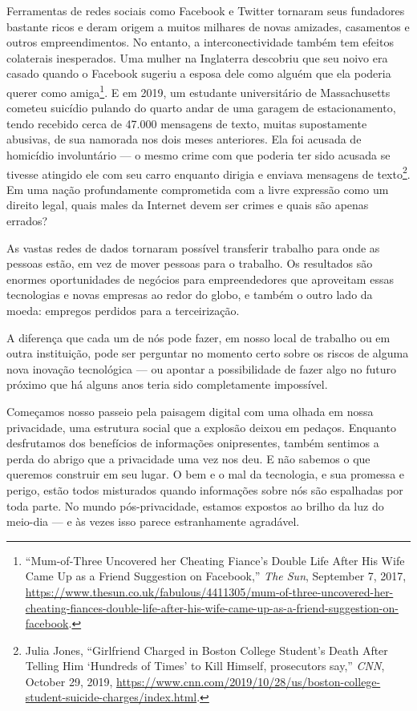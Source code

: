 Ferramentas de redes sociais como Facebook e Twitter tornaram seus fundadores
bastante ricos e deram origem a muitos milhares de novas amizades, casamentos e
outros empreendimentos. No entanto, a interconectividade também tem efeitos
colaterais inesperados. Uma mulher na Inglaterra descobriu que seu noivo era
casado quando o Facebook sugeriu a esposa dele como alguém que ela poderia
querer como amiga\footnote{``Mum-of-Three Uncovered her Cheating Fiance's Double
Life After His Wife Came Up as a Friend Suggestion on Facebook,'' \textit{The
Sun}, September 7, 2017,
\url{https://www.thesun.co.uk/fabulous/4411305/mum-of-three-uncovered-her-cheating-fiances-double-life-after-his-wife-came-up-as-a-friend-suggestion-on-facebook}.}. E
em 2019, um estudante universitário de Massachusetts
cometeu suicídio pulando do quarto andar de uma garagem de estacionamento, tendo
recebido cerca de 47.000 mensagens de texto, muitas supostamente abusivas, de
sua namorada nos dois meses anteriores. Ela foi acusada de homicídio
involuntário --- o mesmo crime com que poderia ter sido acusada se tivesse
atingido ele com seu carro enquanto dirigia e enviava mensagens de
texto\footnote{Julia Jones, ``Girlfriend Charged in Boston College Student's
Death After Telling Him `Hundreds of Times' to Kill Himself, prosecutors
say,'' \textit{CNN}, October 29, 2019,
\url{https://www.cnn.com/2019/10/28/us/boston-college-student-suicide-charges/index.html}.}. Em
uma nação profundamente comprometida com a livre expressão como um direito
legal, quais males da Internet devem ser crimes e quais são apenas errados?

As vastas redes de dados tornaram possível transferir trabalho para onde as
pessoas estão, em vez de mover pessoas para o trabalho. Os resultados são
enormes oportunidades de negócios para empreendedores que aproveitam essas
tecnologias e novas empresas ao redor do globo, e também o outro lado da moeda:
empregos perdidos para a terceirização.

A diferença que cada um de nós pode fazer, em nosso local de trabalho ou em
outra instituição, pode ser perguntar no momento certo sobre os riscos de alguma
nova inovação tecnológica --- ou apontar a possibilidade de fazer algo no futuro
próximo que há alguns anos teria sido completamente impossível. 

Começamos nosso passeio pela paisagem digital com uma olhada em nossa
privacidade, uma estrutura social que a explosão deixou em pedaços. Enquanto
desfrutamos dos benefícios de informações onipresentes, também sentimos a perda
do abrigo que a privacidade uma vez nos deu. E não sabemos o que queremos
construir em seu lugar. O bem e o mal da tecnologia, e sua promessa e perigo,
estão todos misturados quando informações sobre nós são espalhadas por toda
parte. No mundo pós-privacidade, estamos expostos ao brilho da luz do meio-dia
--- e às vezes isso parece estranhamente agradável.
